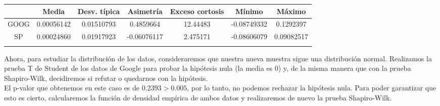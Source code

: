 \documentclass[a4paper,]{article}
\begin{document}
\begin{table}[h!]
\centering
\begin{tabular}{ccccccc}
\hline
\rowcolor[HTML]{C0C0C0} 
\multicolumn{1}{|c|}{\cellcolor[HTML]{C0C0C0}Return} & \multicolumn{1}{c|}{\cellcolor[HTML]{C0C0C0}Media} & \multicolumn{1}{c|}{\cellcolor[HTML]{C0C0C0}Desv. típica} & \multicolumn{1}{c|}{\cellcolor[HTML]{C0C0C0}Asimetría} & \multicolumn{1}{c|}{\cellcolor[HTML]{C0C0C0}Exceso cortosis} & \multicolumn{1}{c|}{\cellcolor[HTML]{C0C0C0}Mínimo} & \multicolumn{1}{c|}{\cellcolor[HTML]{C0C0C0}Máximo} \\ \hline
\multicolumn{1}{|c|}{\cellcolor[HTML]{EFEFEF}GOOG}   & \multicolumn{1}{c|}{0.00056142}                  & \multicolumn{1}{c|}{0.01510793}                                   & \multicolumn{1}{c|}{0.4859664}                         & \multicolumn{1}{c|}{12.44483}                                    & \multicolumn{1}{c|}{-0.08749332}                    & \multicolumn{1}{c|}{0.1292397}                      \\ \hline
\multicolumn{1}{|c|}{\cellcolor[HTML]{EFEFEF}SP}     & \multicolumn{1}{c|}{0.00024860}                  & \multicolumn{1}{c|}{0.01917923}                                   & \multicolumn{1}{c|}{-0.06076117}                        & \multicolumn{1}{c|}{2.475171}                                   & \multicolumn{1}{c|}{-0.08606079}                    & \multicolumn{1}{c|}{0.09082517}                     \\ \hline
\multicolumn{1}{l}{}                                 & \multicolumn{1}{l}{}                               & \multicolumn{1}{l}{}                                              & \multicolumn{1}{l}{}                                   & \multicolumn{1}{l}{}                                            & \multicolumn{1}{l}{}                                & \multicolumn{1}{l}{}                               
\end{tabular}
\end{table}

Ahora, para estudiar la distribución de los datos, consideraremos que nuestra nueva muestra sigue una distribución normal. Realizamos la prueba T de Student de los datos de Google para probar la hipótesis nula (la media es 0) y, de la misma manera que con la prueba Shapiro-Wilk, decidiremos si refutar o quedarnos con la hipótesis. \\

El p-valor que obtenemos en este caso es de $0.2393>0.005$, por lo tanto, no podemos rechazar la hipótesis nula. Para poder garantizar que esto es cierto, calcularemos la función de densidad empírica de ambos datos y realizaremos de nuevo la prueba Shapiro-Wilk. \\
\end{document}

